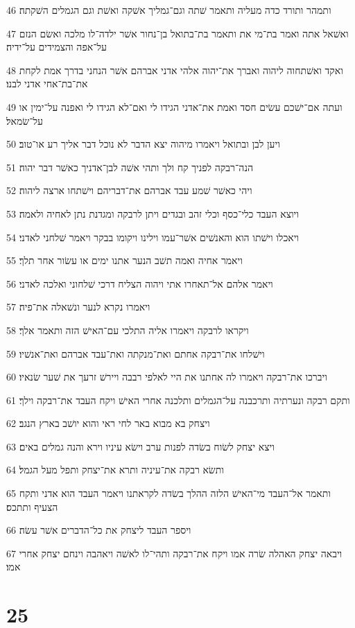 \par 46 ותמהר ותורד כדה מעליה ותאמר שׁתה וגם־גמליך אשׁקה ואשׁת וגם הגמלים השׁקתה׃
\par 47 ואשׁאל אתה ואמר בת־מי את ותאמר בת־בתואל בן־נחור אשׁר ילדה־לו מלכה ואשׂם הנזם על־אפה והצמידים על־ידיה׃
\par 48 ואקד ואשׁתחוה ליהוה ואברך את־יהוה אלהי אדני אברהם אשׁר הנחני בדרך אמת לקחת את־בת־אחי אדני לבנו׃
\par 49 ועתה אם־ישׁכם עשׂים חסד ואמת את־אדני הגידו לי ואם־לא הגידו לי ואפנה על־ימין או על־שׂמאל׃
\par 50 ויען לבן ובתואל ויאמרו מיהוה יצא הדבר לא נוכל דבר אליך רע או־טוב׃
\par 51 הנה־רבקה לפניך קח ולך ותהי אשׁה לבן־אדניך כאשׁר דבר יהוה׃
\par 52 ויהי כאשׁר שׁמע עבד אברהם את־דבריהם וישׁתחו ארצה ליהוה׃
\par 53 ויוצא העבד כלי־כסף וכלי זהב ובגדים ויתן לרבקה ומגדנת נתן לאחיה ולאמה׃
\par 54 ויאכלו וישׁתו הוא והאנשׁים אשׁר־עמו וילינו ויקומו בבקר ויאמר שׁלחני לאדני׃
\par 55 ויאמר אחיה ואמה תשׁב הנער אתנו ימים או עשׂור אחר תלך׃
\par 56 ויאמר אלהם אל־תאחרו אתי ויהוה הצליח דרכי שׁלחוני ואלכה לאדני׃
\par 57 ויאמרו נקרא לנער ונשׁאלה את־פיה׃
\par 58 ויקראו לרבקה ויאמרו אליה התלכי עם־האישׁ הזה ותאמר אלך׃
\par 59 וישׁלחו את־רבקה אחתם ואת־מנקתה ואת־עבד אברהם ואת־אנשׁיו׃
\par 60 ויברכו את־רבקה ויאמרו לה אחתנו את היי לאלפי רבבה ויירשׁ זרעך את שׁער שׂנאיו׃
\par 61 ותקם רבקה ונערתיה ותרכבנה על־הגמלים ותלכנה אחרי האישׁ ויקח העבד את־רבקה וילך׃
\par 62 ויצחק בא מבוא באר לחי ראי והוא יושׁב בארץ הנגב׃
\par 63 ויצא יצחק לשׂוח בשׂדה לפנות ערב וישׂא עיניו וירא והנה גמלים באים׃
\par 64 ותשׂא רבקה את־עיניה ותרא את־יצחק ותפל מעל הגמל׃
\par 65 ותאמר אל־העבד מי־האישׁ הלזה ההלך בשׂדה לקראתנו ויאמר העבד הוא אדני ותקח הצעיף ותתכס׃
\par 66 ויספר העבד ליצחק את כל־הדברים אשׁר עשׂה׃
\par 67 ויבאה יצחק האהלה שׂרה אמו ויקח את־רבקה ותהי־לו לאשׁה ויאהבה וינחם יצחק אחרי אמו׃

\chapter{25}

